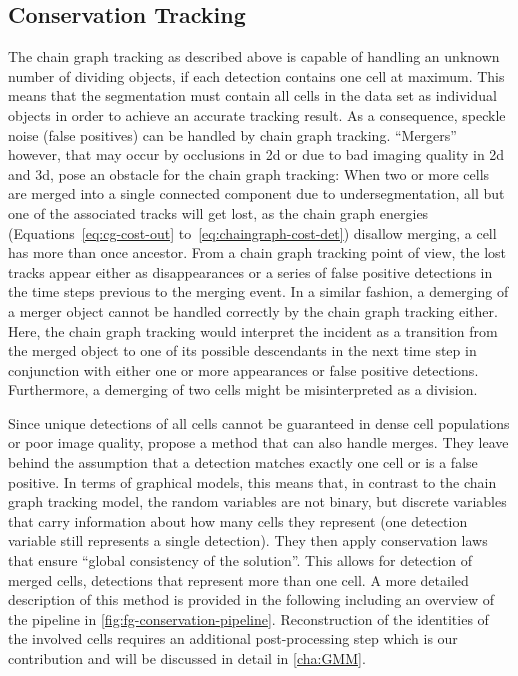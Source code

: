 \subsection{Conservation Tracking}
\label{subsec:fg-conservation}

The chain graph tracking as described above is capable of handling an unknown number of dividing
objects, if each detection contains one cell at maximum. This means that the segmentation must
contain all cells in the data set as individual objects in order to achieve an accurate tracking
result. As a consequence, speckle noise (false positives) can be handled by chain graph tracking.
``Mergers'' however, that may occur by occlusions in 2d or due to bad imaging quality in 2d and 3d,
pose an obstacle for the chain graph tracking: When two or more cells are merged into a single
connected component due to undersegmentation, all but one of the associated tracks will get lost, as
the chain graph energies (Equations~\ref{eq:cg-cost-out} to~\ref{eq:chaingraph-cost-det}) disallow merging, \ie a
cell has more than once ancestor. From a chain graph tracking point of view, the lost tracks appear
either as disappearances or a series of false positive detections in the time steps previous to the
merging event. In a similar fashion, a demerging of a merger object cannot be handled correctly by
the chain graph tracking either. Here, the chain graph tracking would interpret the incident as a
transition from the merged object to one of its possible descendants in the next time step in
conjunction with either one or more appearances or false positive detections. Furthermore, a
demerging of two cells might be misinterpreted as a division.

Since unique detections of all cells cannot be guaranteed in dense cell populations or poor image
quality, \citet{schiegg_13_conservation} propose a method that can also handle merges. They leave
behind the assumption that a detection matches exactly one cell or is a false positive. In terms of
graphical models, this means that, in contrast to the chain graph tracking model, the random
variables are not binary, but discrete variables that carry information about how many cells they
represent (one detection variable still represents a single detection). They then apply conservation
laws that ensure ``global consistency of the solution''. This allows for detection of merged cells,
\ie detections that represent more than one cell. A more detailed description of this method is
provided in the following including an overview of the pipeline in
\cref{fig:fg-conservation-pipeline}. Reconstruction of the identities of the involved cells requires
an additional post-processing step which is our contribution and will be discussed in detail in
\cref{cha:GMM}.

